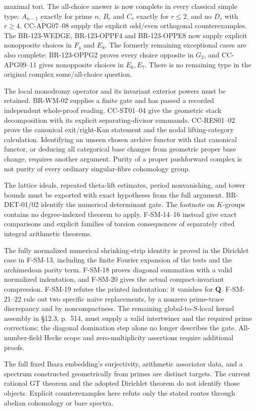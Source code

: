 \begin{description}[style=nextline,leftmargin=0pt]
maximal tori. The all-choice answer is now complete in every classical simple
type: $A_{n-1}$ exactly for prime $n$, $B_r$ and $C_r$ exactly
for $r\leq2$, and no $D_r$ with $r\geq4$. CC-APG07--08
supply the explicit odd/even orthogonal counterexamples. The
BR-123-WEDGE, BR-123-OPPF4 and BR-123-OPPE8 now supply
explicit nonopposite choices in $F_4$ and $E_8$.  The formerly remaining
exceptional cases are also complete: BR-123-OPPG2 proves every
choice opposite in $G_2$, and CC-APG09--11 gives nonopposite
choices in $E_6,E_7$. There is no remaining type in the original
complex some/all-choice question.
\item[Weight--monodromy and universal-curve categories.]
The local monodromy operator and its invariant exterior powers must
be retained. BR-WM-02 supplies a finite gate and has passed a
recorded independent whole-proof reading. CC-ST01--04 give the geometric
stack decomposition with its explicit separating-divisor summands.
CC-RES01--02 prove the canonical exit/right-Kan statement and the nodal
lifting-category calculation. Identifying an unseen chosen archive
functor with that canonical functor, or deducing all categorical base
changes from geometric proper base change, requires another argument.
Purity of a proper pushforward
complex is not purity of every ordinary singular-fibre cohomology group.
\item[The analytic method as a transferable theorem.]
The lattice ideals, repeated theta-lift estimates, period nonvanishing,
and tower bounds must be exported with exact hypotheses from the
full argument. BR-DET-01/02 identify the numerical determinant gate.
The footnote on $K$-groups contains no degree-indexed theorem to apply.
F-SM-14--16 instead give exact comparisons and explicit families of
torsion consequences of separately cited integral arithmetic theorems.
\item[Masullo's operator realization.]
The fully normalized numerical shrinking-strip identity is proved in
the Dirichlet case in F-SM-13, including the finite Fourier expansion
of the tests and the archimedean parity term. F-SM-18 proves diagonal summation with a valid normalized indentation,
and F-SM-20 gives the actual compact-invariant compression. F-SM-19
refutes the printed indentation: it vanishes for $\mathbf Q$.
F-SM-21--22 rule out two specific naive replacements, by a nonzero
prime-trace discrepancy and by noncompactness. The remaining
global-to-$S$-local kernel assembly in \S12.3, p.~514, must supply
a valid intertwiner and the required prime corrections; the
diagonal domination step alone no longer describes the gate. All-number-field Hecke scope and
zero-multiplicity assertions require additional proofs.
\item[Profinite GT, anabelian reconstruction and geometric spectra.]
The full fixed Ihara embedding's surjectivity, arithmetic associator
data, and a spectrum constructed geometrically from primes are distinct
targets. The current rational GT theorem and the adopted Dirichlet
theorem do not identify those objects. Explicit counterexamples here
refute only the stated routes through abelian cohomology or bare spectra.
\end{description}

